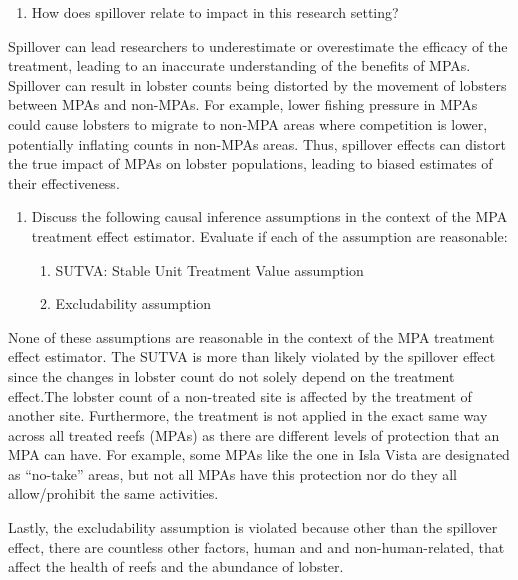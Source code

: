 \documentclass[
]{article}
\providecommand{\tightlist}{%
  \setlength{\itemsep}{0pt}\setlength{\parskip}{0pt}}
\begin{document}
\begin{enumerate}
\def\labelenumi{\alph{enumi}.}
\setcounter{enumi}{2}
\tightlist
\item
  How does spillover relate to impact in this research setting?
\end{enumerate}

Spillover can lead researchers to underestimate or overestimate the
efficacy of the treatment, leading to an inaccurate understanding of the
benefits of MPAs. Spillover can result in lobster counts being distorted
by the movement of lobsters between MPAs and non-MPAs. For example,
lower fishing pressure in MPAs could cause lobsters to migrate to
non-MPA areas where competition is lower, potentially inflating counts
in non-MPAs areas. Thus, spillover effects can distort the true impact
of MPAs on lobster populations, leading to biased estimates of their
effectiveness.

\begin{enumerate}
\def\labelenumi{\alph{enumi}.}
\setcounter{enumi}{3}
\item
  Discuss the following causal inference assumptions in the context of
  the MPA treatment effect estimator. Evaluate if each of the assumption
  are reasonable:

  \begin{enumerate}
  \def\labelenumii{\arabic{enumii})}
  \tightlist
  \item
    SUTVA: Stable Unit Treatment Value assumption
  \item
    Excludability assumption
  \end{enumerate}
\end{enumerate}

None of these assumptions are reasonable in the context of the MPA
treatment effect estimator. The SUTVA is more than likely violated by
the spillover effect since the changes in lobster count do not solely
depend on the treatment effect.The lobster count of a non-treated site
is affected by the treatment of another site. Furthermore, the treatment
is not applied in the exact same way across all treated reefs (MPAs) as
there are different levels of protection that an MPA can have. For
example, some MPAs like the one in Isla Vista are designated as
``no-take'' areas, but not all MPAs have this protection nor do they all
allow/prohibit the same activities.

Lastly, the excludability assumption is violated because other than the
spillover effect, there are countless other factors, human and and
non-human-related, that affect the health of reefs and the abundance of
lobster.
\end{document}
